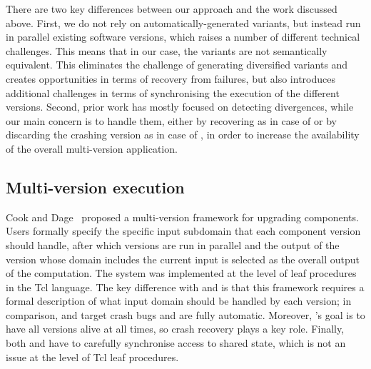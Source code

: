 
There are two key differences between our approach and the work discussed
above. First, we do not rely on automatically-generated variants, but instead
run in parallel existing software versions, which raises a number of different
technical challenges.  This means that in our case, the variants are not
semantically equivalent. This eliminates the challenge of generating
diversified variants and creates opportunities in terms of recovery from
failures, but also introduces additional challenges in terms of synchronising
the execution of the different versions.  Second, prior work has mostly focused
on detecting divergences, while our main concern is to handle them, either
by recovering as in case of \mx or by discarding the crashing version as in
case of \varan, in order to increase the availability of the overall
multi-version application.


\subsection{Multi-version execution}

Cook and Dage~\cite{cook:icse99} proposed a multi-version framework for
upgrading components. Users formally specify the specific input subdomain that
each component version should handle, after which versions are run in parallel
and the output of the version whose domain includes the current input is
selected as the overall output of the computation. The system was implemented
at the level of leaf procedures in the Tcl language. The key difference with
\mx and \varan is that this framework requires a formal description of what
input domain should be handled by each version; in comparison, \mx and \varan
target crash bugs and are fully automatic.  Moreover, \mx's goal is to have all
versions alive at all times, so crash recovery plays a key role.  Finally, both
\mx and \varan have to carefully synchronise access to shared state, which is
not an issue at the level of Tcl leaf procedures.

